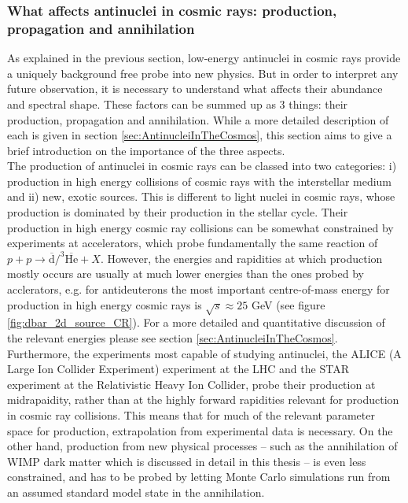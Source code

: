 \subsubsection{ What affects antinuclei in cosmic rays: production, propagation and annihilation}
As explained in the previous section, low-energy antinuclei in cosmic rays provide a uniquely background free probe into new physics. But in order to interpret any future observation, it is necessary to understand what affects their abundance and spectral shape. These factors can be summed up as 3 things: their production, propagation and annihilation. While a more detailed description of each is given in section \ref{sec:AntinucleiInTheCosmos}, this section aims to give a brief introduction on the importance of the three aspects. \\

The production of antinuclei in cosmic rays can be classed into two categories: i) production in high energy collisions of cosmic rays with the interstellar medium and ii) new, exotic sources. This is different to light nuclei in cosmic rays, whose production is dominated by their production in the stellar cycle. Their production in high energy cosmic ray collisions can be somewhat constrained by experiments at accelerators, which probe fundamentally the same reaction of $p + p \rightarrow \overline{\mathrm{d}}/^3{\overline{\mathrm{He}}} + X$. However, the energies and rapidities at which production mostly occurs are usually at much lower energies than the ones probed by acclerators, e.g. for antideuterons the most important centre-of-mass energy for production in high energy cosmic rays is $\sqrt{s}\approx 25$ GeV (see figure \ref{fig:dbar_2d_source_CR}). For a more detailed and quantitative discussion of the relevant energies please see section \ref{sec:AntinucleiInTheCosmos}. Furthermore, the experiments most capable of studying antinuclei, the ALICE (A Large Ion Collider Experiment) experiment at the LHC and the STAR experiment \cite{Xu_2014} at the Relativistic Heavy Ion Collider, probe their production at midrapaidity, rather than at the highly forward rapidities relevant for production in cosmic ray collisions. This means that for much of the relevant parameter space for production, extrapolation from experimental data is necessary. On the other hand, production from new physical processes -- such as the annihilation of WIMP dark matter which is discussed in detail in this thesis -- is even less constrained, and has to be probed by letting Monte Carlo simulations run from an assumed standard model state in the annihilation. \\

